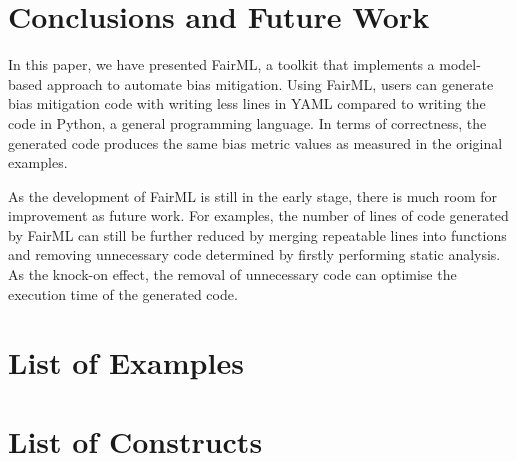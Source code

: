 \documentclass[sigconf,review]{acmart}
\begin{document}


\section{Conclusions and Future Work}
\label{sec:conclusions_and_future_work}
In this paper, we have presented FairML, a toolkit that implements a model-based approach to automate bias mitigation. Using FairML, users can generate bias mitigation code with writing less lines in YAML compared to writing the code in Python, a general programming language.
In terms of correctness, the generated code produces the same bias metric values as measured in the original examples.

As the development of FairML is still in the early stage, 
there is much room for improvement as future work. For examples, the number of lines of code generated by FairML can still be further reduced by merging repeatable lines into functions and removing unnecessary code determined by firstly performing static analysis. 
As the knock-on effect, the removal of unnecessary code can optimise the execution time of the generated code. 

\appendix

\section{List of Examples}
\label{sec:list_of_examples}




\section{List of Constructs}
\label{sec:list_of_constructs}
\end{document}
